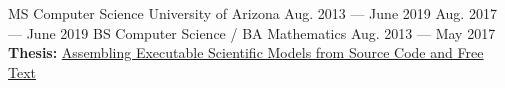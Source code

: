 
\vspace{-0.2cm}
\begin{cventries}
  \cventry
    {MS Computer Science} %
    {University of Arizona} %
    {Aug. 2013 --- June 2019} %
    {Aug. 2017 --- June 2019} %
    {}
    \vspace{-.55cm}
    \cventry
    {BS Computer Science / BA Mathematics} %
    {} %
    {} %
    {Aug. 2013 --- May 2017} %
    {\textbf{Thesis:} \href{https://repository.arizona.edu/handle/10150/634301}{\underline{Assembling Executable Scientific Models from Source Code and Free Text}}}
  
\end{cventries}
